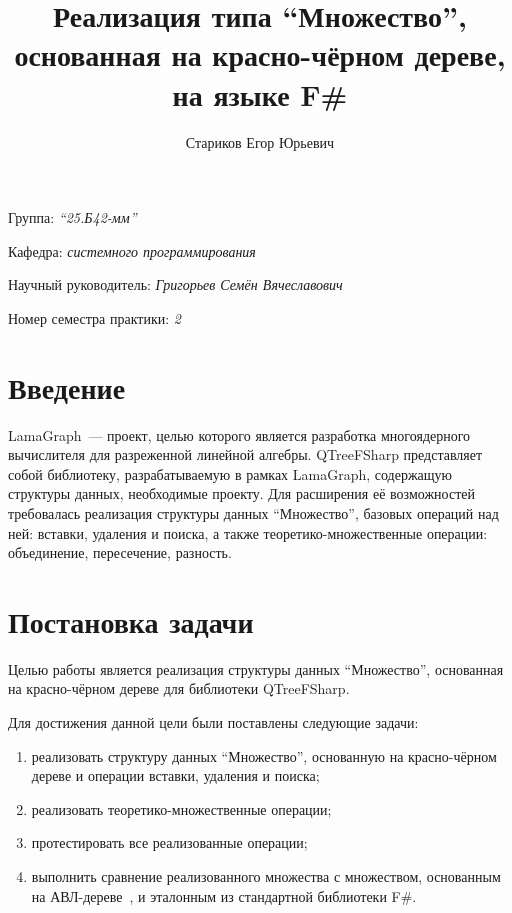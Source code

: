 \documentclass[a4paper]{article}
\title{Реализация типа \enquote{Множество}, основанная на красно-чёрном дереве, на языке F\#}
\author{Стариков Егор Юрьевич}
\date{}
\begin{document}
\maketitle

\begin{flushright}
    Группа: \emph{\enquote{25.Б42-мм}}

    Кафедра: \emph{системного программирования}

    Научный руководитель: \emph{Григорьев Семён Вячеславович}

    
    
    Номер семестра практики: \emph{2}
\end{flushright} 


\section{Введение}

LamaGraph~--- проект, целью которого является разработка многоядерного вычислителя для разреженной линейной алгебры.
QTreeFSharp представляет собой библиотеку, разрабатываемую в рамках LamaGraph, содержащую структуры данных, необходимые проекту. 
Для расширения её возможностей требовалась реализация структуры данных \enquote{Множество}, базовых операций над ней: вставки, удаления и поиска, 
а также теоретико-множественные операции: объединение, пересечение, разность.

\section{Постановка задачи}
Целью работы является реализация структуры данных \enquote{Множество}, основанная на красно-чёрном дереве для библиотеки QTreeFSharp.

Для достижения данной цели были поставлены следующие задачи: 
\begin{enumerate}
    \item реализовать структуру данных \enquote{Множество}, основанную на красно-чёрном дереве и операции вставки, удаления и поиска;
    \item реализовать теоретико-множественные операции;
    \item протестировать все реализованные операции;
    \item выполнить сравнение реализованного множества с множеством, основанным на АВЛ-дереве~\cite{AVL}, и эталонным из стандартной библиотеки F\#.
\end{enumerate}
\end{document}
